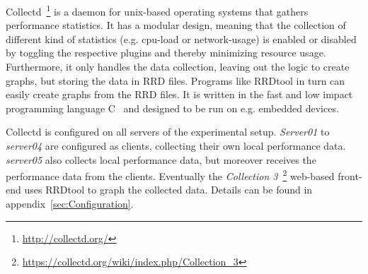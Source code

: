 Collectd~\footnote{\url{http://collectd.org/}} is a daemon for unix-based operating systems that gathers performance statistics. It has a modular design, meaning that the collection of different kind of statistics (e.g. cpu-load or network-usage) is enabled or disabled by toggling the respective plugins and thereby minimizing resource usage. Furthermore, it only handles the data collection, leaving out the logic to create graphs, but storing the data in \ac{RRD} files. Programs like RRDtool in turn can easily create graphs from the RRD files. It is written in the fast and low impact programming language C~\cite{prechelt2000empirical} and designed to be run on e.g. embedded devices.

Collectd is configured on all servers of the experimental setup. \emph{Server01} to \emph{server04} are configured as clients, collecting their own local performance data. \emph{server05} also collects local performance data, but moreover receives the performance data from the clients. Eventually the \emph{Collection 3}~\footnote{\url{https://collectd.org/wiki/index.php/Collection_3}} web-based front-end uses RRDtool to graph the collected data. Details can be found in appendix~\ref{sec:Configuration}.
